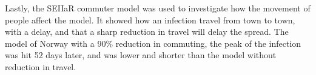 \documentclass{article}
\begin{document}
    Lastly, the SEIIaR commuter model was used to investigate how the movement of people affect the model.
    It showed how an infection travel from town to town, with a delay, and that a sharp reduction in travel will delay the spread. 
    The model of Norway with a 90\% reduction in commuting, the peak of the infection was hit 52 days later, and was lower and shorter than the model without reduction in travel.
    \printbibliography
\end{document}
